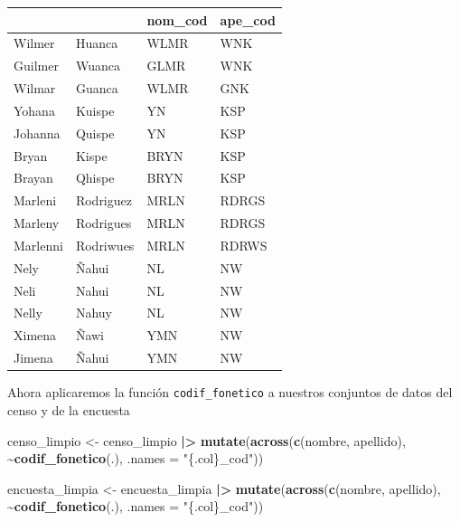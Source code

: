 \documentclass[
  12pt,
]{book}
\newenvironment{Shaded}{\begin{snugshade}}{\end{snugshade}}
\newcommand{\AttributeTok}[1]{\textcolor[rgb]{0.13,0.29,0.53}{#1}}
\newcommand{\FunctionTok}[1]{\textcolor[rgb]{0.13,0.29,0.53}{\textbf{#1}}}
\newcommand{\NormalTok}[1]{#1}
\newcommand{\OtherTok}[1]{\textcolor[rgb]{0.56,0.35,0.01}{#1}}
\newcommand{\SpecialCharTok}[1]{\textcolor[rgb]{0.81,0.36,0.00}{\textbf{#1}}}
\newcommand{\StringTok}[1]{\textcolor[rgb]{0.31,0.60,0.02}{#1}}
\begin{document}
\begin{table}[t]
\fontsize{12.0pt}{14.4pt}\selectfont
\begin{tabular*}{\linewidth}{@{\extracolsep{\fill}}llll}
\toprule
{\bfseries \cellcolor[HTML]{F9F9F9}{nombre}} & {\bfseries \cellcolor[HTML]{F9F9F9}{apellido}} & nom\_cod & ape\_cod \\ 
\midrule\addlinespace[2.5pt]
Wilmer & Huanca & WLMR & WNK \\ 
Guilmer & Wuanca & GLMR & WNK \\ 
Wilmar & Guanca & WLMR & GNK \\ 
Yohana & Kuispe & YN & KSP \\ 
Johanna & Quispe & YN & KSP \\ 
Bryan & Kispe & BRYN & KSP \\ 
Brayan & Qhispe & BRYN & KSP \\ 
Marleni & Rodriguez & MRLN & RDRGS \\ 
Marleny & Rodrigues & MRLN & RDRGS \\ 
Marlenni & Rodriwues & MRLN & RDRWS \\ 
Nely & Ñahui & NL & NW \\ 
Neli & Nahui & NL & NW \\ 
Nelly & Nahuy & NL & NW \\ 
Ximena & Ñawi & YMN & NW \\ 
Jimena & Ñahui & YMN & NW \\ 
\bottomrule
\end{tabular*}
\end{table}

Ahora aplicaremos la función \texttt{codif\_fonetico} a nuestros conjuntos de datos del censo y de la encuesta

\begin{Shaded}
\begin{Highlighting}[]
\NormalTok{censo\_limpio }\OtherTok{\textless{}{-}}\NormalTok{ censo\_limpio }\SpecialCharTok{|\textgreater{}} 
                \FunctionTok{mutate}\NormalTok{(}\FunctionTok{across}\NormalTok{(}\FunctionTok{c}\NormalTok{(nombre, apellido), }\SpecialCharTok{\textasciitilde{}}\FunctionTok{codif\_fonetico}\NormalTok{(.), }\AttributeTok{.names =} \StringTok{"\{.col\}\_cod"}\NormalTok{))}

\NormalTok{encuesta\_limpia }\OtherTok{\textless{}{-}}\NormalTok{ encuesta\_limpia }\SpecialCharTok{|\textgreater{}} 
                   \FunctionTok{mutate}\NormalTok{(}\FunctionTok{across}\NormalTok{(}\FunctionTok{c}\NormalTok{(nombre, apellido), }\SpecialCharTok{\textasciitilde{}}\FunctionTok{codif\_fonetico}\NormalTok{(.), }\AttributeTok{.names =} \StringTok{"\{.col\}\_cod"}\NormalTok{))}
\end{Highlighting}
\end{Shaded}
\end{document}
